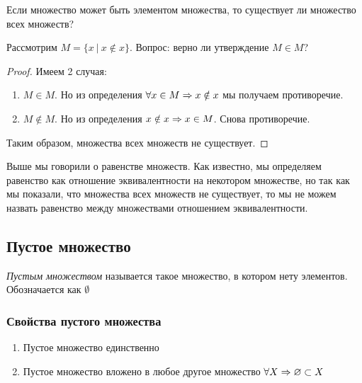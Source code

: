 Если множество может быть элементом множества, то существует ли множество всех множеств?
 
\begin{proposition}
    Рассмотрим $M = \{x\ |\ x \notin x\}$. Вопрос: верно ли утверждение $M \in M$?
\end{proposition}
 
\begin{proof}
    Имеем 2 случая:
    
    \begin{enumerate}
        \item $M \in M$. Но из определения $\forall x \in M \Rightarrow x \notin x$ мы получаем противоречие.
        \item $M \notin M$. Но из определения $x \notin x \Rightarrow x \in M$. Снова противоречие.
    \end{enumerate}
    
    Таким образом, множества всех множеств не существует.
\end{proof}
 
\begin{note}
    Выше мы говорили о равенстве множеств. Как известно, мы определяем равенство как отношение эквивалентности на некотором множестве, но так как мы показали, что множества всех множеств не существует, то мы не можем назвать равенство между множествами отношением эквивалентности.
\end{note}
 
\subsection{Пустое множество}
 
\begin{definition}
    \textit{Пустым множеством} называется такое множество, в котором нету элементов. Обозначается как $\emptyset$
\end{definition}
 
\subsubsection{Свойства пустого множества}
 
\begin{enumerate}
     \item Пустое множество единственно
     \item Пустое множество вложено в любое другое множество $\forall X \Rightarrow \varnothing \subset X$
\end{enumerate}
 
